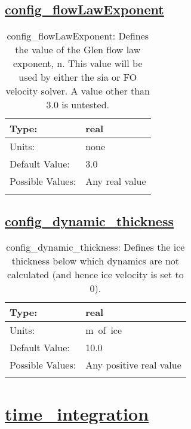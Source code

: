 \subsection[config\_flowLawExponent]{\hyperref[sec:nm_tab_physical_parameters]{config\_flowLawExponent}}
\label{subsec:nm_sec_config_flowLawExponent}
\begin{center}
\begin{longtable}{| p{2.0in} || p{4.0in} |}
    \hline
    Type: & real \\
    \hline
    Units: & \si{none} \\
    \hline
    Default Value: & 3.0 \\
    \hline
    Possible Values: & Any real value \\
    \hline
    \caption{config\_flowLawExponent: Defines the value of the Glen flow law exponent, n. This value will be used by either the sia or FO velocity solver.  A value other than 3.0 is untested.}
\end{longtable}
\end{center}
\subsection[config\_dynamic\_thickness]{\hyperref[sec:nm_tab_physical_parameters]{config\_dynamic\_thickness}}
\label{subsec:nm_sec_config_dynamic_thickness}
\begin{center}
\begin{longtable}{| p{2.0in} || p{4.0in} |}
    \hline
    Type: & real \\
    \hline
    Units: & \si{m.of.ice} \\
    \hline
    Default Value: & 10.0 \\
    \hline
    Possible Values: & Any positive real value \\
    \hline
    \caption{config\_dynamic\_thickness: Defines the ice thickness below which dynamics are not calculated (and hence ice velocity is set to 0).}
\end{longtable}
\end{center}
\section[time\_integration]{\hyperref[sec:nm_tab_time_integration]{time\_integration}}
\label{sec:nm_sec_time_integration}
